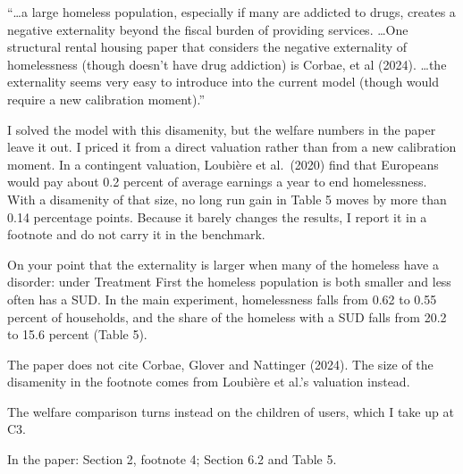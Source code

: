 \documentclass[11pt]{article}
\begin{document}
\begin{referee}
``\dots a large homeless population, especially if many are addicted to drugs,
creates a negative externality beyond the fiscal burden of providing services.
\dots One structural rental housing paper that considers the negative externality
of homelessness (though doesn't have drug addiction) is Corbae, et al (2024).
\dots the externality seems very easy to introduce into the current model (though
would require a new calibration moment).''
\end{referee}
\begin{response}
\open I solved the model with this disamenity, but the welfare numbers in the paper
leave it out. I priced it from a direct valuation rather than from a new calibration
moment. In a contingent valuation, Loubi\`ere et al.\ (2020) find that Europeans would pay
about 0.2 percent of average earnings a year to end homelessness. With a disamenity of that
size, no long run gain in Table 5 moves by more than 0.14 percentage points. Because it
barely changes the results, I report it in a footnote and do not carry it in the benchmark.

On your point that the externality is larger when many of the homeless have a disorder:
under Treatment First the homeless population is both smaller and less often has a SUD. In
the main experiment, homelessness falls from 0.62 to 0.55 percent of households, and the
share of the homeless with a SUD falls from 20.2 to 15.6 percent (Table 5).

The paper does not cite Corbae, Glover and Nattinger (2024). The size of the disamenity in
the footnote comes from Loubi\`ere et al.'s valuation instead.

The welfare comparison turns instead on the children of users, which I take up at C3.

In the paper: Section 2, footnote 4; Section 6.2 and Table 5.
\end{response}
\end{document}
